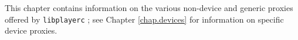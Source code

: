 \documentclass[11pt]{report}
\def\libplayerc {{\tt libplayerc} }
\begin{document}
This chapter contains information on the various non-device and
generic proxies offered by \libplayerc; see Chapter \ref{chap.devices}
for information on specific device proxies.

%
%



%
%



%
\end{document}

